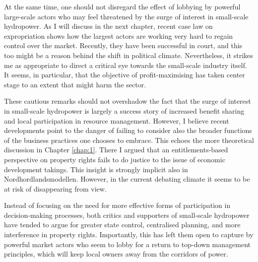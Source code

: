 At the same time, one should not disregard the effect of lobbying by powerful large-scale actors who may feel threatened by the surge of interest in small-scale hydropower. As I will discuss in the next chapter, recent case law on expropriation shows how the largest actors are working very hard to regain control over the market. Recently, they have been successful in court, and this too might be a reason behind the shift in political climate. Nevertheless, it strikes me as appropriate to direct a critical eye towards the small-scale industry itself. It seems, in particular, that the objective of profit-maximising has taken center stage to an extent that might harm the sector. %

These cautious remarks should not overshadow the fact that the surge of interest in small-scale hydropower is largely a success story of increased benefit sharing and local participation in resource management. However, I believe recent developments point to the danger of failing to consider also the broader functions of the business practices one chooses to embrace. This echoes the more theoretical discussion in Chapter \ref{chap:1}. There I argued that an entitlements-based perspective on property rights fails to do justice to the issue of economic development takings. This insight is strongly implicit also in Nordhordlandsmodellen. However, in the current debating climate it seems to be at risk of disappearing from view.  

Instead of focusing on the need for more effective forms of participation in decision-making processes, both critics and supporters of small-scale hydropower have tended to argue for greater state control, centralised planning, and more interference in property rights. Importantly, this has left them open to capture by powerful market actors who seem to lobby for a return to top-down management principles, which will keep local owners away from the corridors of power.

